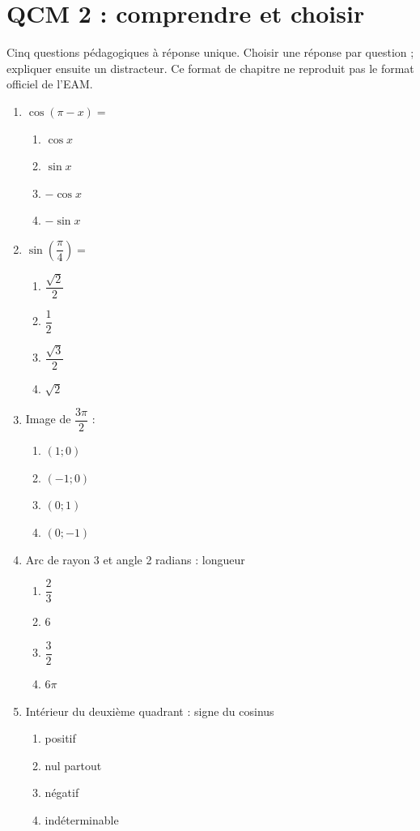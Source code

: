 \endgroup
\begingroup\small
{}\section*{QCM 2 : comprendre et choisir}\label{C10-Q2}
Cinq questions pédagogiques à réponse unique. Choisir une réponse par question ; expliquer ensuite un distracteur. Ce format de chapitre ne reproduit pas le format officiel de l’EAM.
\begin{enumerate}
\item $\cos(\pi-x)=$
\begin{enumerate}[label=\Alph*.,itemsep=2pt]
\item $\cos x$
\item $\sin x$
\item $-\cos x$
\item $-\sin x$
\end{enumerate}
\item $\sin (\dfrac{\pi}{4})=$
\begin{enumerate}[label=\Alph*.,itemsep=2pt]
\item $\dfrac{\sqrt 2}{2}$
\item $\dfrac{1}{2}$
\item $\dfrac{\sqrt 3}{2}$
\item $\sqrt2$
\end{enumerate}
\item Image de $\dfrac{3\pi}{2}$ :
\begin{enumerate}[label=\Alph*.,itemsep=2pt]
\item $(1;0)$
\item $(-1;0)$
\item $(0;1)$
\item $(0;-1)$
\end{enumerate}
\item Arc de rayon 3 et angle 2 radians : longueur
\begin{enumerate}[label=\Alph*.,itemsep=2pt]
\item $\dfrac{2}{3}$
\item $6$
\item $\dfrac{3}{2}$
\item $6\pi$
\end{enumerate}
\item Intérieur du deuxième quadrant : signe du cosinus
\begin{enumerate}[label=\Alph*.,itemsep=2pt]
\item positif
\item nul partout
\item négatif
\item indéterminable
\end{enumerate}
\end{enumerate}
